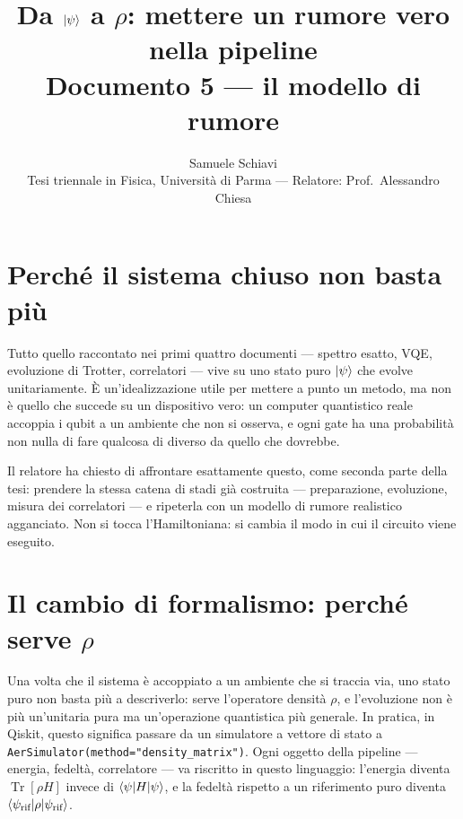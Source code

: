 \documentclass[11pt,a4paper]{article}
\title{\bfseries Da $\lvert \psi\rangle$ a $\rho$: mettere un rumore vero nella pipeline\\[2pt]
\large Documento 5 --- il modello di rumore}
\author{Samuele Schiavi \\ \small Tesi triennale in Fisica, Università di Parma
--- Relatore: Prof.\ Alessandro Chiesa}
\date{}
\newcommand{\Tr}{\operatorname{Tr}}
\begin{document}
\maketitle
\thispagestyle{fancy}

\section{Perché il sistema chiuso non basta più}

Tutto quello raccontato nei primi quattro documenti --- spettro esatto, VQE,
evoluzione di Trotter, correlatori --- vive su uno stato puro $\lvert \psi\rangle$ che
evolve unitariamente. È un'idealizzazione utile per mettere a punto un metodo,
ma non è quello che succede su un dispositivo vero: un computer quantistico
reale accoppia i qubit a un ambiente che non si osserva, e ogni gate ha una
probabilità non nulla di fare qualcosa di diverso da quello che dovrebbe.

Il relatore ha chiesto di affrontare esattamente questo, come seconda parte
della tesi: prendere la stessa catena di stadi già costruita --- preparazione,
evoluzione, misura dei correlatori --- e ripeterla con un modello di rumore
realistico agganciato. Non si tocca l'Hamiltoniana: si cambia il modo in cui
il circuito viene eseguito.


\section{Il cambio di formalismo: perché serve $\rho$}

Una volta che il sistema è accoppiato a un ambiente che si traccia via, uno
stato puro non basta più a descriverlo: serve l'operatore densità $\rho$, e
l'evoluzione non è più un'unitaria pura ma un'operazione quantistica più
generale. In pratica, in Qiskit, questo significa passare da un simulatore a
vettore di stato a \texttt{AerSimulator(method="density\_matrix")}. Ogni
oggetto della pipeline --- energia, fedeltà, correlatore --- va riscritto in
questo linguaggio: l'energia diventa $\Tr[\rho H]$ invece di
$\langle \psi \rvert H\lvert \psi\rangle$, e la fedeltà rispetto a un riferimento puro diventa
$\langle \psi_\text{rif} \rvert\rho\lvert \psi_\text{rif}\rangle$.
\end{document}
